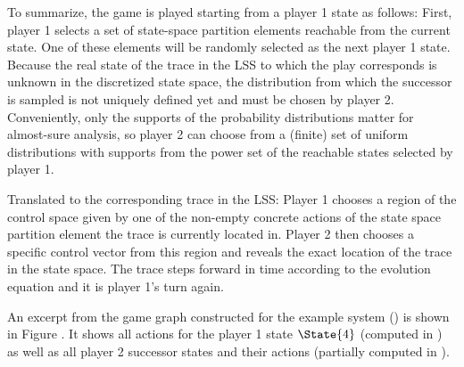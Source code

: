     To summarize, the game is played starting from a player 1 state as follows:
    First, player 1 selects a set of state-space partition elements reachable from the current state.
    One of these elements will be randomly selected as the next player 1 state.
    Because the real state of the trace in the LSS to which the play corresponds is unknown in the discretized state space, the distribution from which the successor is sampled is not uniquely defined yet and must be chosen by player 2.
    Conveniently, only the supports of the probability distributions matter for almost-sure analysis, so player 2 can choose from a (finite) set of uniform distributions with supports from the power set of the reachable states selected by player 1.

    Translated to the corresponding trace in the LSS:
    Player 1 chooses a region of the control space given by one of the non-empty concrete actions of the state space partition element the trace is currently located in.
    Player 2 then chooses a specific control vector from this region and reveals the exact location of the trace in the state space.
    The trace steps forward in time according to the evolution equation and it is player 1's turn again.


    An excerpt from the game graph constructed for the example system () is shown in Figure .
    It shows all actions for the player 1 state $\State{4}$ (computed in ) as well as all player 2 successor states and their actions (partially computed in ).


\stopsubsection

